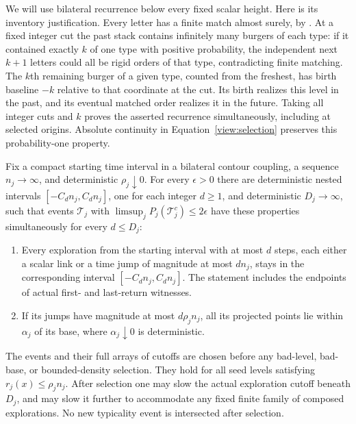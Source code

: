 We will use bilateral recurrence below every fixed scalar height.  Here
is its inventory justification.  Every letter has a finite match almost
surely, by \cite[Proposition~2.2]{SheffieldInventory}.  At a fixed integer
cut the past stack contains infinitely many burgers of each type: if it
contained exactly $k$ of one type with positive probability, the independent
next $k+1$ letters could all be rigid orders of that type, contradicting
finite matching.  The $k$th remaining burger of a given type, counted from
the freshest, has birth baseline $-k$ relative to that coordinate at the
cut.  Its birth realizes this level in the past, and its eventual matched
order realizes it in the future.  Taking all integer cuts and $k$ proves
the asserted recurrence simultaneously, including at selected origins.
Absolute continuity in Equation~\eqref{view:selection} preserves this
probability-one property.

\begin{lemma}
\label{view:macroscopic-cutoffs}
Fix a compact starting time interval in a bilateral contour coupling,
a sequence $n_j\to\infty$, and deterministic $\rho_j\downarrow0$.
For every $\epsilon>0$ there are deterministic nested intervals
$[-C_dn_j,C_dn_j]$, one for each integer $d\ge1$, and deterministic
$D_j\to\infty$, such that events $\mathcal T_j$ with
$\limsup_jP_j(\mathcal T_j^c)\le2\epsilon$ have these properties
simultaneously for every $d\le D_j$:
\begin{enumerate}[label=(\roman*)]
\item Every exploration from the starting interval with at most $d$
steps, each either a scalar link or a time jump of magnitude at most
$dn_j$, stays in the
corresponding interval $[-C_dn_j,C_dn_j]$.  The statement includes
the endpoints of actual first- and last-return witnesses.
\item If its jumps have magnitude at most $d\rho_jn_j$, all its
projected points lie within $\alpha_j$ of its base, where
$\alpha_j\downarrow0$ is deterministic.
\end{enumerate}
The events and their full arrays of cutoffs are chosen before any
bad-level, bad-base, or bounded-density selection.  They hold for all
seed levels satisfying $r_j(x)\le\rho_j n_j$.  After selection one
may slow the actual exploration cutoff beneath $D_j$, and may slow
it further to accommodate any fixed finite family of composed
explorations.  No new typicality event is intersected after selection.
\end{lemma}

